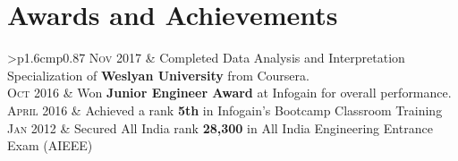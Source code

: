 \documentclass[a4paper]{article} %
\newcommand{\verticalspacing}{-0.25cm}
\newcommand{\headspace}{-0.3cm}
\newcommand{\bulletspace}{0.7cm}
\newcommand{\projectheadspacing}{6.9cm}
\newcommand{\gitproject}[3]{%
    \begin{tabular}{p{0.60\linewidth}r}
        \textcolor{NavyBlue}{\small #2} & \multicolumn{1}{m{ \projectheadspacing{} }}{\raggedleft #1}\\
    \end{tabular}\\
    \begin{tabular}{p{0.98\linewidth}}
        \vspace{\headspace{}}
        \small{#3}
    \end{tabular}
    \vspace{\verticalspacing{}}
    \vspace{-0.2cm} %
}
\newcommand{\itemlist}[1]{%
    \def\arraystretch{1.2}
    \begin{tabular}{>{\raggedleft}p{1.6cm}p{0.87\linewidth}}
        #1
    \end{tabular}
    \def\arraystretch{1.0}
}
\newcommand{\skill}[2]{%
    \begin{tabular}{p{0.60\linewidth}r}
        \small {#2} & \multicolumn{1}{m{ \projectheadspacing{} }}{\raggedleft \textsc{\small #1}}\\
    \end{tabular}
    \vspace{\verticalspacing{}}
}
\begin{document}
\section{Awards and Achievements}

\itemlist {%
    \textsc{\small Nov 2017}    & Completed Data Analysis and Interpretation Specialization of \textbf{Weslyan University} from Coursera. \\
    \textsc{\small Oct 2016}    & Won \textbf{Junior Engineer Award} at Infogain for overall performance. \\
    \textsc{\small April 2016}  & Achieved a rank \textbf{5th} in Infogain’s Bootcamp Classroom Training \\
    \textsc{\small Jan 2012}    & Secured All India rank \textbf{28,300} in All India Engineering Entrance Exam (AIEEE) \\
  }





\end{document}

